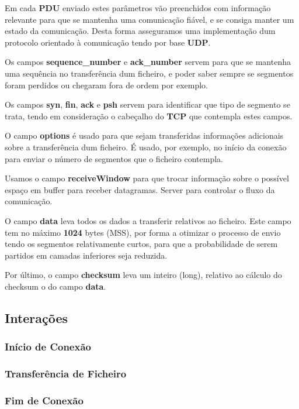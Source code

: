 \documentclass{llncs}
\begin{document}
Em cada \textbf{PDU} enviado estes parâmetros vão preenchidos com informação relevante para que se mantenha uma comunicação fiável, e se consiga manter um estado da comunicação. Desta forma asseguramos uma implementação dum protocolo orientado à comunicação tendo por base \textbf{UDP}.

Os campos \textbf{sequence\_number} e \textbf{ack\_number} servem para que se mantenha uma sequência no transferência dum ficheiro, e poder saber sempre se segmentos foram perdidos ou chegaram fora de ordem por exemplo.

Os campos \textbf{syn}, \textbf{fin}, \textbf{ack} e \textbf{psh} servem para identificar que tipo de segmento se trata, tendo em consideração o cabeçalho do \textbf{TCP} que contempla estes campos.

O campo \textbf{options} é usado para que sejam transferidas informações adicionais sobre a transferência dum ficheiro. É usado, por exemplo, no início da conexão para enviar o número de segmentos que o ficheiro contempla.

Usamos o campo \textbf{receiveWindow} para que trocar informação sobre o possível espaço em buffer para receber datagramas. Server para controlar o fluxo da comunicação.

O campo \textbf{data} leva todos os dados a transferir relativos ao ficheiro. Este campo tem no máximo \textbf{1024} bytes (MSS), por forma a otimizar o processo de envio tendo os segmentos relativamente curtos, para que a probabilidade de serem partidos em camadas inferiores seja reduzida.

Por último, o campo \textbf{checksum} leva um inteiro (long), relativo ao cálculo do checksum o do campo \textbf{data}. 


\subsection{Interações}

\subsubsection{Início de Conexão}



\subsubsection{Transferência de Ficheiro}

\subsubsection{Fim de Conexão}
\end{document}
